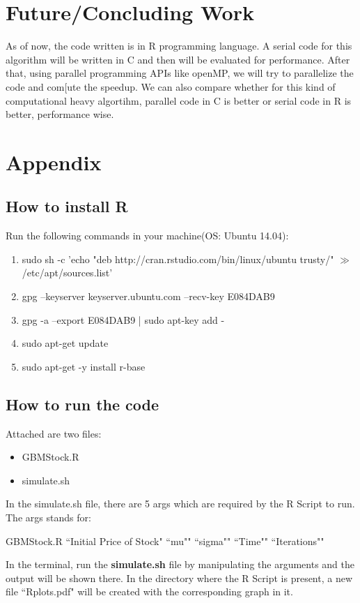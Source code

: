 \documentclass[10pt,a4paper]{article}
\begin{document}
\section{Future/Concluding Work}
As of now, the code written is in R programming language. A serial code for this algorithm will be written in C and then will be evaluated for performance. After that, using parallel programming APIs like openMP, we will try to parallelize the code and com[ute the speedup. We can also compare whether for this kind of computational heavy algortihm, parallel code in C is better or serial code in R is better, performance wise. 

\section{Appendix}
\subsection{How to install R}
Run the following commands in your machine(OS: Ubuntu 14.04):
\begin{enumerate}
\item sudo sh -c 'echo "deb http://cran.rstudio.com/bin/linux/ubuntu trusty/" $\gg$ /etc/apt/sources.list'
\item gpg --keyserver keyserver.ubuntu.com --recv-key E084DAB9
\item gpg -a --export E084DAB9 | sudo apt-key add -
\item sudo apt-get update
\item sudo apt-get -y install r-base
\end{enumerate}
\subsection{How to run the code}
Attached are two files:
\begin{itemize}
\item GBMStock.R
\item simulate.sh
\end{itemize}
In the simulate.sh file, there are 5 args which are required by the R Script to run. The args stands for:\\
\begin{center}
GBMStock.R ``Initial Price of Stock" ``mu"" ``sigma"" ``Time"" ``Iterations""
\end{center}
In the terminal, run the \textbf{simulate.sh} file by manipulating the arguments and the output will be shown there. In the directory where the R Script is present, a new file ``Rplots.pdf" will be created with the corresponding graph in it.
\end{document}
